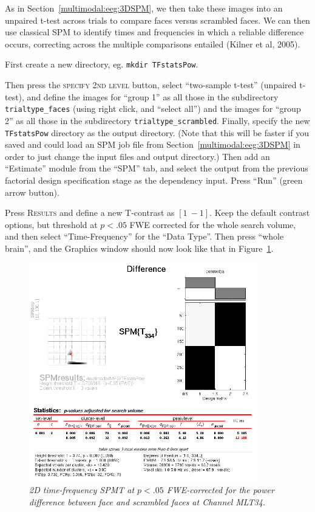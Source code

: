 As in Section~\ref{multimodal:eeg:3DSPM}, we then take these images into an unpaired t-test across trials to compare faces versus scrambled faces. We can then use classical SPM to identify times and frequencies in which a reliable difference occurs, correcting across the multiple comparisons entailed (Kilner et al, 2005).

First create a new directory, eg. \texttt{mkdir TFstatsPow}.

Then press the \textsc{specify 2nd level} button, select ``two-sample t-test'' (unpaired t-test), and define the images for ``group 1'' as all those in the subdirectory \texttt{trialtype\_faces} (using right click, and ``select all'') and the images for ``group 2'' as all those in the subdirectory \texttt{trialtype\_scrambled}. Finally, specify the new \texttt{TFstatsPow} directory as the output directory. (Note that this will be faster if you saved and could load an SPM job file from Section~\ref{multimodal:eeg:3DSPM} in order to just change the input files and output directory.) Then add an ``Estimate'' module from the ``SPM'' tab, and select the output from the previous factorial design specification stage as the dependency input. Press ``Run'' (green arrow button).

Press \textsc{Results} and define a new T-contrast as $[1\: -1]$. Keep the default contrast options, but threshold at $p<.05$ FWE corrected for the whole search volume, and then select ``Time-Frequency'' for the ``Data Type''. Then press ``whole brain'', and the Graphics window should now look like that in Figure~\ref{multimodal:fig:16}.

\begin{figure}
\begin{center}
\includegraphics[width=100mm]{multimodal/figures/meg_TF_results}
\caption{\em 2D time-frequency SPM{T} at $p<.05$ FWE-corrected for the power difference between face and scrambled faces at Channel MLT34.\label{multimodal:fig:16}}
\end{center}
\end{figure}

